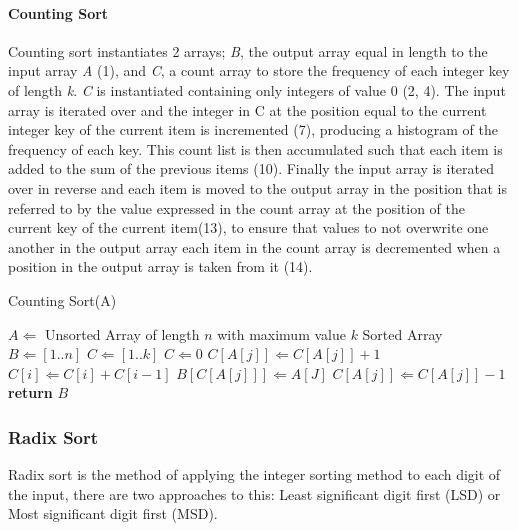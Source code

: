 \documentclass[12pt]{article}
\begin{document}
	\paragraph{Counting Sort}
	\label{ssec:counting}
	Counting sort instantiates 2 arrays; \textit{B}, the output array equal in length to the input array \textit{A} (1), and \textit{C}, a count array to store the frequency of each integer key of length \textit{k}. \textit{C} is instantiated containing only integers of value 0 (2, 4). The input array is iterated over and the integer in C at the position equal to the current integer key of the current item is incremented (7), producing a histogram of the frequency of each key. This count list is then accumulated such that each item is added to the sum of the previous items (10). Finally the input array is iterated over in reverse and each item is moved to the output array in the position that is referred to by the value expressed in the count array at the position of the current key of the current item(13), to ensure that values to not overwrite one another in the output array each item in the count array is decremented when a position in the output array is taken from it (14).
	\begin{algorithm}[H]
		\caption{Counting Sort({A})}
		\label{alg2}
		\begin{algorithmic}[1]					
			\REQUIRE $A \Leftarrow$ Unsorted Array of length $n$ with maximum value $k$
			\ENSURE Sorted Array
			\STATE $B \Leftarrow [1..n]$ 
			\STATE $C \Leftarrow [1..k]$ 
				\STATE $C \Leftarrow 0$
			\ENDFOR
				\STATE $C[A[j]] \Leftarrow C[A[j]] + 1$ 
			\ENDFOR
				\STATE $C[i] \Leftarrow C[i] + C[i-1]$
			\ENDFOR
				\STATE $B[C[A[j]]] \Leftarrow A[J]$ 
				\STATE $C[A[j]] \Leftarrow C[A[j]] - 1$ 
			\ENDFOR
			\STATE \textbf{return} $B$
		\end{algorithmic}
	\end{algorithm}	
	\pagebreak
	\subsubsection{Radix Sort}
	Radix sort is the method of applying the integer sorting method to each digit of the input, there are two approaches to this: Least significant digit first (LSD) or Most significant digit first (MSD).
\end{document}
